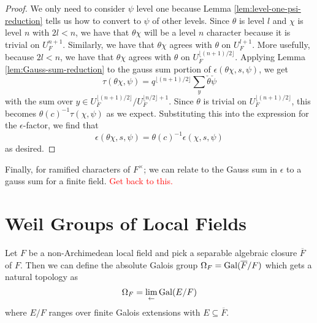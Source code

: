 \begin{proof}
  We only need to consider $\psi$ level one because Lemma \ref{lem:level-one-psi-reduction} tells us how to convert to $\psi$ of other levels.
  Since $\theta$ is level $l$ and $\chi$ is level $n$ with $2l < n$, we have that $\theta\chi$ will be a level $n$ character because it is trivial on $U_F^{n+1}$.
  Similarly, we have that $\theta \chi$ agrees with $\theta$ on $U_F^{l+1}$.
  More usefully, because $2l < n$, we have that $\theta \chi$ agrees with $\theta$ on $U_F^{\lfloor (n+1)/2 \rfloor}$.
  Applying Lemma \ref{lem:Gauss-sum-reduction} to the gauss sum portion of $\epsilon(\theta\chi,s,\psi)$, we get
  \[\tau(\theta \chi, \psi) = q^{\lfloor (n+1)/2\rfloor} \sum_y \check{\theta}\check{\psi}\]
  with the sum over $y \in U_F^{\lfloor (n+1)/2 \rfloor}/U_F^{\lfloor n/2 \rfloor + 1}$.
  Since $\theta$ is trivial on $U_F^{\lfloor (n+1)/2 \rfloor}$, this becomes $\theta(c)^{-1} \tau(\chi, \psi)$ as we expect.
  Substituting this into the expression for the $\epsilon$-factor, we find that
  \[\epsilon(\theta\chi, s, \psi) = \theta(c)^{-1} \epsilon(\chi, s, \psi)\]
  as desired.
\end{proof}

Finally, for ramified characters of $F^\times$; we can relate to the Gauss sum in $\epsilon$ to a gauss sum for a finite field.
\textcolor{red}{Get back to this.}
\section{Weil Groups of Local Fields}
Let $F$ be a non-Archimedean local field and pick a separable algebraic closure $\overline{F}$ of $F$.
Then we can define the absolute Galois group $\Omega_F = \textrm{Gal}(\overline{F}/F)$ which gets a natural topology as
\[\Omega_F = \lim_{\leftarrow} \textrm{Gal}(E/F)\]
where $E/F$ ranges over finite Galois extensions with $E \subseteq \overline{F}$.

